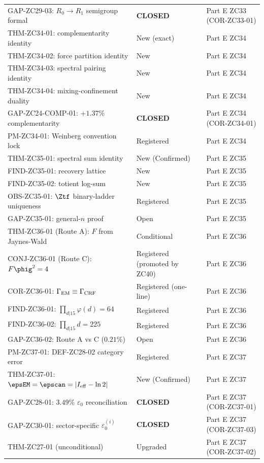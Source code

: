 \documentclass[12pt, a4paper]{article}
\begin{document}
{\begin{longtable}{>{\raggedright\arraybackslash}p{6.4cm}
                  >{\centering\arraybackslash}p{2.6cm}
                  >{\raggedright\arraybackslash}p{3.6cm}}
GAP-ZC29-03: $R_0\to R_1$ semigroup formal & \textbf{CLOSED} & Part E ZC33 (COR-ZC33-01) \\
THM-ZC34-01: complementarity identity & New (exact) & Part E ZC34 \\
THM-ZC34-02: force partition identity & New & Part E ZC34 \\
THM-ZC34-03: spectral pairing identity & New & Part E ZC34 \\
THM-ZC34-04: mixing-confinement duality & New & Part E ZC34 \\
GAP-ZC24-COMP-01: $+1.37\%$ complementarity & \textbf{CLOSED} & Part E ZC34 (COR-ZC34-01) \\
PM-ZC34-01: Weinberg convention lock & Registered & Part E ZC34 \\
THM-ZC35-01: spectral sum identity & New (Confirmed) & Part E ZC35 \\
FIND-ZC35-01: recovery lattice & New & Part E ZC35 \\
FIND-ZC35-02: totient log-sum & New & Part E ZC35 \\
OBS-ZC35-01: $\Ztf$ binary-ladder uniqueness & Registered & Part E ZC35 \\
GAP-ZC35-01: general-$n$ proof & Open & Part E ZC35 \\
THM-ZC36-01 (Route A): $F$ from Jaynes-Wald & Conditional & Part E ZC36 \\
CONJ-ZC36-01 (Route C): $F\phig^2 = 4$ & Registered (promoted by ZC40) & Part E ZC36 \\
COR-ZC36-01: $\Gamma_{\rm EM} \equiv \Gamma_{\rm CRF}$ & Registered (one-line) & Part E ZC36 \\
FIND-ZC36-01: $\prod_{d|15}\varphi(d) = 64$ & Registered & Part E ZC36 \\
FIND-ZC36-02: $\prod_{d|15} d = 225$ & Registered & Part E ZC36 \\
GAP-ZC36-02: Route A vs C ($0.21\%$) & Open & Part E ZC36 \\
PM-ZC37-01: DEF-ZC28-02 category error & Registered & Part E ZC37 \\
THM-ZC37-01: $\epsEM = \epscan = |I_{\rm eff} - \ln 2|$ & New (Confirmed) & Part E ZC37 \\
GAP-ZC28-01: $3.49\%$ $\varepsilon_0$ reconciliation & \textbf{CLOSED} & Part E ZC37 (COR-ZC37-01) \\
GAP-ZC30-01: sector-specific $\varepsilon_0^{(i)}$ & \textbf{CLOSED} & Part E ZC37 (COR-ZC37-03) \\
THM-ZC27-01 (unconditional) & Upgraded & Part E ZC37 (COR-ZC37-02) \\

\end{longtable}}
\end{document}
